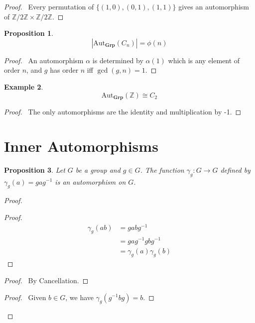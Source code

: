 \documentclass{book}
\let\qed\relax
\newtheorem{prop}{Proposition}[chapter]
\theoremstyle{definition}
\newtheorem{ex}[prop]{Example}
\newcommand{\inv}[1]{\ensuremath{{#1}^{-1}}}
\newcommand{\Aut}[2]{\ensuremath{\mathrm{Aut}_{#1} \left( {#2} \right)}}
\newcommand{\Grp}{\ensuremath{\mathbf{Grp}}}
\begin{document}
\begin{proof}
    \pf\ Every permutation of $\{ (1,0), (0,1), (1,1) \}$ gives an automorphism of $\mathbb{Z} / 2 \mathbb{Z} \times \mathbb{Z} / 2 \mathbb{Z}$. \qed
\end{proof}

\begin{prop}
    \[ |\Aut{\Grp}{C_n}| = \phi(n) \]
\end{prop}

\begin{proof}
    \pf\ An automorphism $\alpha$ is determined by $\alpha(1)$ which is any element of order $n$, and $g$ has order $n$ iff $\gcd(g,n) = 1$. \qed
\end{proof}

\begin{ex}
    \[ \Aut{\Grp}{\mathbb{Z}} \cong C_2 \]
\end{ex}

\begin{proof}
    \pf\ The only automorphisms are the identity and multiplication by -1. \qed
\end{proof}

\section{Inner Automorphisms}

\begin{prop}
    Let $G$ be a group and $g \in G$. The function $\gamma_g : G \rightarrow G$ defined by $\gamma_g(a) = ga\inv{g}$ is an automorphism on $G$.
\end{prop}

\begin{proof}
    \pf
    \begin{proof}
        \pf
        \begin{align*}
            \gamma_g(ab) & = gab\inv{g} \\
            & = ga\inv{g} gb\inv{g} \\
            & = \gamma_g(a) \gamma_g(b)
        \end{align*}
    \end{proof}
    \begin{proof}
        \pf\ By Cancellation.
    \end{proof}
    \begin{proof}
        \pf\ Given $b \in G$, we have $\gamma_g(\inv{g}bg) = b$.
    \end{proof}
    \qed
\end{proof}
\end{document}
